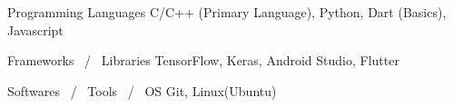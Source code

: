

\begin{cvskills}

  \cvskill
    {Programming Languages} %
    {C/C++ (Primary Language), Python, Dart (Basics), Javascript} %


  \cvskill
    {Frameworks \, / \, Libraries} %
    {TensorFlow, Keras, Android Studio, Flutter} %

\cvskill
    {Softwares \, / \, Tools \, / \, OS} %
    {Git, Linux(Ubuntu)} %

\end{cvskills}

